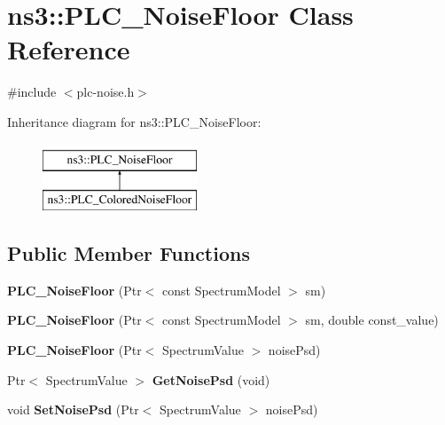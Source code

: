 \hypertarget{classns3_1_1PLC__NoiseFloor}{\section{ns3\-:\-:\-P\-L\-C\-\_\-\-Noise\-Floor \-Class \-Reference}
\label{classns3_1_1PLC__NoiseFloor}
}


{\ttfamily \#include $<$plc-\/noise.\-h$>$}

\-Inheritance diagram for ns3\-:\-:\-P\-L\-C\-\_\-\-Noise\-Floor\-:\begin{figure}[H]
\begin{center}
\leavevmode
\includegraphics[height=2.000000cm]{classns3_1_1PLC__NoiseFloor}
\end{center}
\end{figure}
\subsection*{\-Public \-Member \-Functions}
\begin{DoxyCompactItemize}
\item 
\hypertarget{classns3_1_1PLC__NoiseFloor_a929e11a1b98a75fe779d710102a8e5ad}{{\bfseries \-P\-L\-C\-\_\-\-Noise\-Floor} (\-Ptr$<$ const \-Spectrum\-Model $>$ sm)}\label{classns3_1_1PLC__NoiseFloor_a929e11a1b98a75fe779d710102a8e5ad}

\item 
\hypertarget{classns3_1_1PLC__NoiseFloor_a83c4f01ccfcd295490e7b80bed8edd20}{{\bfseries \-P\-L\-C\-\_\-\-Noise\-Floor} (\-Ptr$<$ const \-Spectrum\-Model $>$ sm, double const\-\_\-value)}\label{classns3_1_1PLC__NoiseFloor_a83c4f01ccfcd295490e7b80bed8edd20}

\item 
\hypertarget{classns3_1_1PLC__NoiseFloor_a95dd4d649df4e9a200fea6e4789ab51e}{{\bfseries \-P\-L\-C\-\_\-\-Noise\-Floor} (\-Ptr$<$ \-Spectrum\-Value $>$ noise\-Psd)}\label{classns3_1_1PLC__NoiseFloor_a95dd4d649df4e9a200fea6e4789ab51e}

\item 
\hypertarget{classns3_1_1PLC__NoiseFloor_aeceb1c5d56a20c44fec0714861ae81ef}{\-Ptr$<$ \-Spectrum\-Value $>$ {\bfseries \-Get\-Noise\-Psd} (void)}\label{classns3_1_1PLC__NoiseFloor_aeceb1c5d56a20c44fec0714861ae81ef}

\item 
\hypertarget{classns3_1_1PLC__NoiseFloor_acbac0d9043687dd2fc66260a01e642ec}{void {\bfseries \-Set\-Noise\-Psd} (\-Ptr$<$ \-Spectrum\-Value $>$ noise\-Psd)}\label{classns3_1_1PLC__NoiseFloor_acbac0d9043687dd2fc66260a01e642ec}

\end{DoxyCompactItemize}

